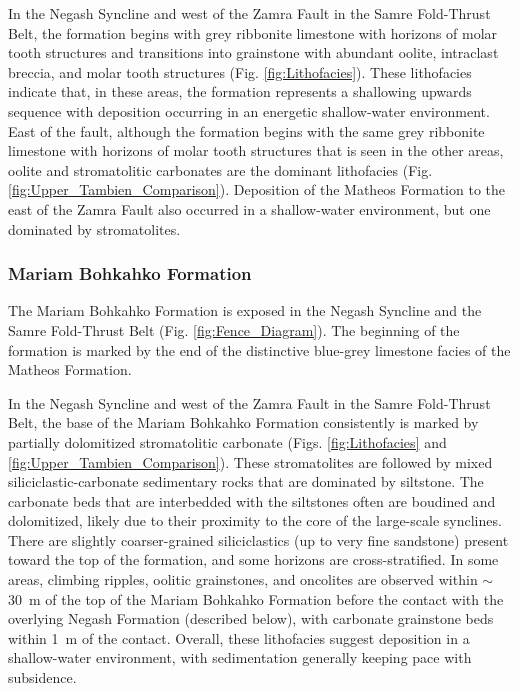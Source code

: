 \documentclass[11pt,letterpaper]{article}
\begin{document}
In the Negash Syncline and west of the Zamra Fault in the Samre Fold-Thrust Belt, the formation begins with grey ribbonite limestone with horizons of molar tooth structures and transitions into grainstone with abundant oolite, intraclast breccia, and molar tooth structures (Fig. \ref{fig:Lithofacies}). These lithofacies indicate that, in these areas, the formation represents a shallowing upwards sequence with deposition occurring in an energetic shallow-water environment. East of the fault, although the formation begins with the same grey ribbonite limestone with horizons of molar tooth structures that is seen in the other areas, oolite and stromatolitic carbonates are the dominant lithofacies (Fig. \ref{fig:Upper_Tambien_Comparison}). Deposition of the Matheos Formation to the east of the Zamra Fault also occurred in a shallow-water environment, but one dominated by stromatolites.

\subsubsection*{Mariam Bohkahko Formation}

The Mariam Bohkahko Formation is exposed in the Negash Syncline and the Samre Fold-Thrust Belt (Fig. \ref{fig:Fence_Diagram}). The beginning of the formation is marked by the end of the distinctive blue-grey limestone facies of the Matheos Formation.

In the Negash Syncline and west of the Zamra Fault in the Samre Fold-Thrust Belt, the base of the Mariam Bohkahko Formation consistently is marked by partially dolomitized stromatolitic carbonate (Figs. \ref{fig:Lithofacies} and \ref{fig:Upper_Tambien_Comparison}). These stromatolites are followed by mixed siliciclastic-carbonate sedimentary rocks that are dominated by siltstone. The carbonate beds that are interbedded with the siltstones often are boudined and dolomitized, likely due to their proximity to the core of the large-scale synclines. There are slightly coarser-grained siliciclastics (up to very fine sandstone) present toward the top of the formation, and some horizons are cross-stratified. In some areas, climbing ripples, oolitic grainstones, and oncolites are observed within $\sim$30~m of the top of the Mariam Bohkahko Formation before the contact with the overlying Negash Formation (described below), with carbonate grainstone beds within 1~m of the contact. Overall, these lithofacies suggest deposition in a shallow-water environment, with sedimentation generally keeping pace with subsidence.
\end{document}
